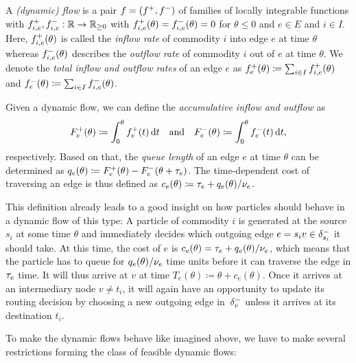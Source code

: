 \begin{definition}
    A \emph{(dynamic) flow} is a pair $f = ({f}^+, {f}^-)$ of families of locally integrable functions with ${f}^+_{i,e}, {f}^-_{i,e} : \mathbb{R} \rightarrow \mathbb{R}_{\geq 0}$ with ${f}^+_{i,e}(\theta) = {f}^-_{i,e}(\theta) = 0$ for $\theta \leq 0$ and  $e\in E$ and $i\in I$.
    Here, ${f}^+_{i,e}(\theta)$ is called the \emph{inflow rate} of commodity $i$ into edge $e$ at time $\theta$ whereas ${f}^-_{i,e}(\theta)$ describes the \emph{outflow rate} of commodity $i$ out of $e$ at time $\theta$.
    We denote the \emph{total inflow and outflow rates} of an edge $e$ as ${f}^+_e(\theta) \coloneqq \sum_{i\in I} {f}^+_{i,e}(\theta)$ and ${f}^-_e(\theta) \coloneqq \sum_{i\in I}{f}^-_{i,e}(\theta)$.

    Given a dynamic flow, we can define the \emph{accumulative inflow and outflow} as
    \[
        F^+_e(\theta) \coloneqq \int_0^\theta {f}^+_e(t) \,\textnormal{d} t \quad\text{and}\quad  F^-_e(\theta) \coloneqq \int_0^\theta {f}^-_e(t) \,\textnormal{d} t,
    \]
    respectively.
    Based on that, the \emph{queue length} of an edge $e$ at time $\theta$ can be determined as $q_e(\theta) \coloneqq F^+_e(\theta) - F^-_e(\theta + \tau_e)$.
    The time-dependent cost of traversing an edge is thus defined as $c_e(\theta) \coloneqq \tau_e + q_e(\theta) / \nu_e$.
\end{definition}

This definition already leads to a good insight on how particles should behave in a dynamic flow of this type:
A particle of commodity $i$ is generated at the source $s_i$ at some time $\theta$ and immediately decides which outgoing edge $e=s_i v\in \delta^-_{s_i}$ it should take.
At this time, the cost of $e$ is $c_e(\theta) = \tau_e + q_e(\theta) / \nu_e$, which means that the particle has to queue for $q_e(\theta) / \nu_e$ time units before it can traverse the edge in $\tau_e$ time.
It will thus arrive at $v$ at time $T_e(\theta) \coloneqq \theta + c_e(\theta)$.
Once it arrives at an intermediary node $v\neq t_i$, it will again have an opportunity to update its routing decision by choosing a new outgoing edge in~$\delta^-_{v}$ unless it arrives at its destination $t_i$. 

To make the dynamic flows behave like imagined above, we have to make several restrictions forming the class of feasible dynamic flows:

